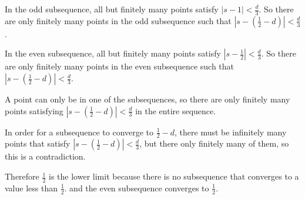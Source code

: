In the odd subsequence, all but finitely many points satisfy $ | s - 1 | < \frac{d}{3} $. So there are only finitely many points in the odd subsequence
such that $ | s - (\frac{1}{2} - d) | < \frac{d}{3} $.

In the even subsequence, all but finitely many points satisfy $ | s - \frac{1}{2} | < \frac{d}{3} $. So there are only finitely many points in the even subsequence
such that $ | s - (\frac{1}{2} - d) | < \frac{d}{3} $.

A point can only be in one of the subsequences, so there are only finitely many points satisfying $ | s - (\frac{1}{2} - d) | < \frac{d}{3} $ in the entire sequence.

In order for a subsequence to converge to $ \frac{1}{2} - d $, there must be infinitely many points that satisfy $ | s - (\frac{1}{2} - d) | < \frac{d}{3} $, but there only finitely many of them, so this is a contradiction. 

Therefore $\frac{1}{2}$ is the lower limit because there is no subsequence that converges to a value less than $\frac{1}{2}$. and the even subsequence converges to $\frac{1}{2}$.